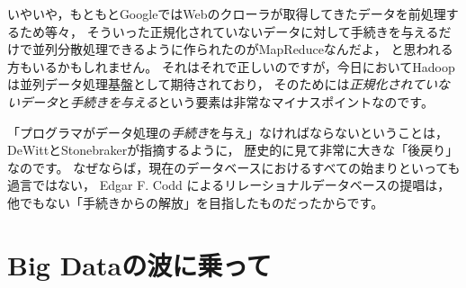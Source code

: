 いやいや，もともとGoogleではWebのクローラが取得してきたデータを前処理するため等々，
そういった正規化されていないデータに対して手続きを与えるだけで並列分散処理できるように作られたのがMapReduceなんだよ，
と思われる方もいるかもしれません。
それはそれで正しいのですが，今日においてHadoopは並列データ処理基盤として期待されており，
そのためには{\em 正規化されていないデータ}と{\em 手続きを与える}という要素は非常なマイナスポイントなのです。

「プログラマがデータ処理の{\em 手続き}を与え」なければならないということは，
DeWittとStonebrakerが指摘するように，
歴史的に見て非常に大きな「後戻り」なのです。
なぜならば，現在のデータベースにおけるすべての始まりといっても過言ではない，
Edgar F. Codd によるリレーショナルデータベースの提唱は，
他でもない「手続きからの解放」を目指したものだったからです。




\section{Big Dataの波に乗って}
